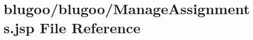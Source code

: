 \hypertarget{ManageAssignments_8jsp}{
\section{blugoo/blugoo/ManageAssignments.jsp File Reference}
\label{ManageAssignments_8jsp}
}


